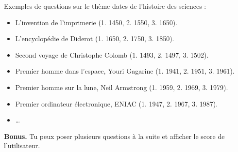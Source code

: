 \documentclass[class=report,crop=false, 12pt]{standalone}
\begin{document}
\begin{activite}
  
Exemples de questions sur le thème \og dates de l'histoire des sciences \fg{} :
\begin{itemize}
  \item L'invention de l'imprimerie (1. 1450, 2. 1550, 3. 1650).
  \item L'encyclopédie de Diderot (1. 1650, 2. 1750, 3. 1850).
  \item Second voyage de Christophe Colomb (1. 1493, 2. 1497, 3. 1502).
  \item Premier homme dans l'espace, Youri Gagarine (1. 1941, 2. 1951, 3. 1961).
  \item Premier homme sur la lune, Neil Armstrong (1. 1959, 2. 1969, 3. 1979).
  \item Premier ordinateur électronique, ENIAC (1. 1947, 2. 1967, 3. 1987).
  \item \ldots
\end{itemize} 

\medskip

\textbf{Bonus.} Tu peux poser plusieurs questions à la suite et afficher le score de l'utilisateur.

\end{activite}
\end{document}
